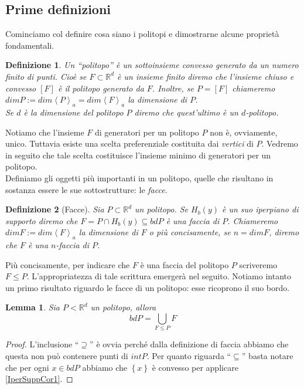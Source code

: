 \documentclass[a4paper,12pt,italian]{article}
\newcommand{\Rd}{\mathbb{R}^d}
\newtheorem{defin}{Definizione}
\newtheorem{lem}{Lemma}
\begin{document}
\subsection{Prime definizioni}
Cominciamo col definire cosa siano i politopi e dimostrarne alcune propriet\`a fondamentali.
\begin{defin}
Un ``politopo'' \`e un sottoinsieme convesso generato da un numero finito di punti. Cio\`e se $F\subset\Rd$ \`e un insieme finito
diremo che l'insieme chiuso e convesso $\left[F\right]$ \`e il politopo generato da $F$. Inoltre, se $P=\left[F\right]$ chiameremo
$dimP:=dim\left<P\right>_a=dim\left<F\right>_a$ la dimensione di $P$.\\
Se $d$ \`e la dimensione del politopo $P$ diremo che quest'ultimo \`e un $d$-politopo.
\end{defin}


Notiamo che l'insieme $F$ di generatori per un politopo $P$ non \`e, ovviamente, unico. Tuttavia esiste una scelta preferenziale
costituita dai \emph{vertici} di $P$. Vedremo in seguito che tale scelta costituisce l'insieme minimo di generatori per un politopo.\\
Definiamo gli oggetti pi\`u importanti in un politopo, quelle che risultano in sostanza essere le sue sottostrutture: le \emph{facce}.
\begin{defin}[Facce]
Sia $P\subset\Rd$ un politopo. Se $H_b(y)$ \`e un suo iperpiano di supporto diremo che $F=P\cap H_b(y)\subseteq bdP$ \`e una 
faccia di $P$. Chiameremo $dimF:=dim\left<F\right>_a$ la dimensione di $F$ o pi\`u concisamente, se $n=dimF$, diremo che $F$ \`e una $n$-faccia
di $P$.
\end{defin}
Pi\`u concisamente, per indicare che $F$ \`e una faccia del politopo $P$ scriveremo $F\leq P$. L'appropriatezza di tale scrittura
emerger\`a nel seguito.
Notiamo intanto un primo risultato riguardo le facce di un politopo: esse ricoprono il suo bordo.
\begin{lem}
\label{BordoFacciaLem1}
Sia $P<\Rd$ un politopo, allora
\begin{equation*}
bdP=\bigcup_{F\leq P}F
\end{equation*}
\end{lem}
\begin{proof}
L'inclusione ``$\supseteq$'' \`e ovvia perch\'e dalla definizione di faccia abbiamo che questa non pu\`o contenere punti di $intP$.
Per quanto riguarda ``$\subseteq$'' basta notare che per ogni $x\in bdP$ abbiamo che $\left\{x\right\}$ \`e convesso per
applicare \ref{IperSuppCor1}.
\end{proof}
\end{document}
